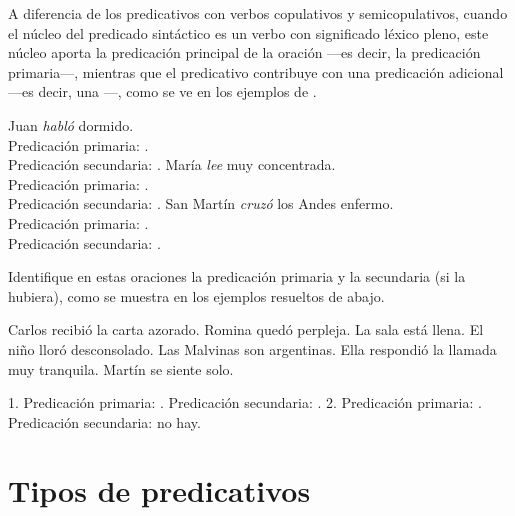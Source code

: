 A diferencia de los predicativos con verbos copulativos y semicopulativos,
cuando el núcleo del predicado sintáctico es un verbo con significado léxico
pleno, este núcleo aporta la predicación principal de la oración ---es decir, la
predicación primaria---, mientras que el predicativo contribuye con una
predicación adicional ---es decir, una ---, como
se ve en los ejemplos de .

\begin{exe}
  \ex\label{ex:09-secundaria}
    \begin{xlist}
      \ex Juan \textit{habló} dormido.\\
          Predicación primaria: .\\
          Predicación secundaria: .
      \ex María \textit{lee} muy concentrada.\\
          Predicación primaria: .\\
          Predicación secundaria: .
      \ex San Martín \textit{cruzó} los Andes enfermo.\\
          Predicación primaria: .\\
          Predicación secundaria: .
    \end{xlist}
\end{exe}

\begin{ejercicio}\label{ej:09-primaria}
Identifique en estas oraciones la predicación primaria y la secundaria (si la
hubiera), como se muestra en los ejemplos resueltos de abajo.

\begin{exe}
  \ex Carlos recibió la carta azorado.
  \ex Romina quedó perpleja.
  \ex La sala está llena.
  \ex El niño lloró desconsolado.
  \ex Las Malvinas son argentinas.
  \ex Ella respondió la llamada muy tranquila.
  \ex Martín se siente solo.
\end{exe}

\begin{resuelto}
1. Predicación primaria: . Predicación
secundaria: . 2. Predicación primaria:
. Predicación secundaria: no hay.
\end{resuelto}
\end{ejercicio}

\section{Tipos de predicativos}\label{sec:09-tipos}

